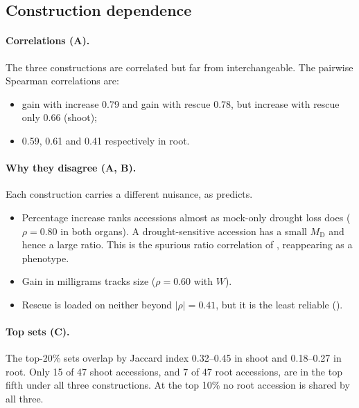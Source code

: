 \documentclass[10pt,twocolumn,a4paper]{article}
\theoremstyle{definition}
\theoremstyle{remark}
\newcommand{\MD}{{M_{\mathrm D}}}
\newcommand{\WD}{W}
\begin{document}
\subsection{Construction dependence}
\label{sec:res-dep}

\paragraph{Correlations (A).} The three constructions are
correlated but far from interchangeable. The pairwise Spearman
correlations \citep{spearman1904} are:
\begin{itemize}[leftmargin=1.3em,itemsep=1pt]
  \item gain with increase 0.79 and gain with rescue 0.78, but increase
  with rescue only 0.66 (shoot);
  \item 0.59, 0.61 and 0.41 respectively in root.
\end{itemize}

\paragraph{Why they disagree (A, B).} Each construction
carries a different nuisance, as  predicts.
\begin{itemize}[leftmargin=1.3em,itemsep=1pt]
  \item Percentage increase ranks accessions almost as mock-only drought
  loss does ($\rho=0.80$ in both organs). A drought-sensitive accession
  has a small $\MD$ and hence a large ratio. This is the spurious ratio
  correlation of \citet{pearson1897}, reappearing as a phenotype.
  \item Gain in milligrams tracks size ($\rho=0.60$ with $\WD$).
  \item Rescue is loaded on neither beyond $|\rho|=0.41$, but it is the
  least reliable ().
\end{itemize}

\paragraph{Top sets (C).} The top-20\% sets overlap by
Jaccard index \citep{jaccard1912} 0.32--0.45 in shoot and 0.18--0.27 in
root. Only 15 of 47 shoot accessions, and 7 of 47 root accessions, are in
the top fifth under all three constructions. At the top 10\% no root
accession is shared by all three.
\end{document}

